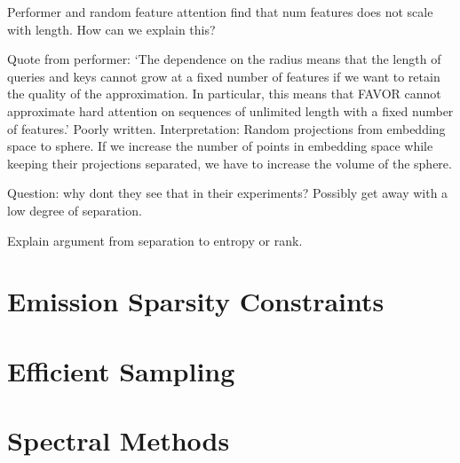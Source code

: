 \documentclass{article}
\begin{document}
Performer and random feature attention find that num features does not scale with
length. How can we explain this?

Quote from performer:
`The dependence on the radius means that the length of queries and keys cannot grow
at a fixed number of features if we want to
retain the quality of the approximation.
In particular, this means that FAVOR cannot approximate
hard attention on sequences of unlimited length with a fixed number of features.'
Poorly written.
Interpretation: Random projections from embedding space to sphere.
If we increase the number of points in embedding space while keeping
their projections separated, we have to increase the volume of the sphere.

Question: why dont they see that in their experiments?
Possibly get away with a low degree of separation.

Explain argument from separation to entropy or rank.

\section{Emission Sparsity Constraints}

\section{Efficient Sampling}

\section{Spectral Methods}



\end{document}
